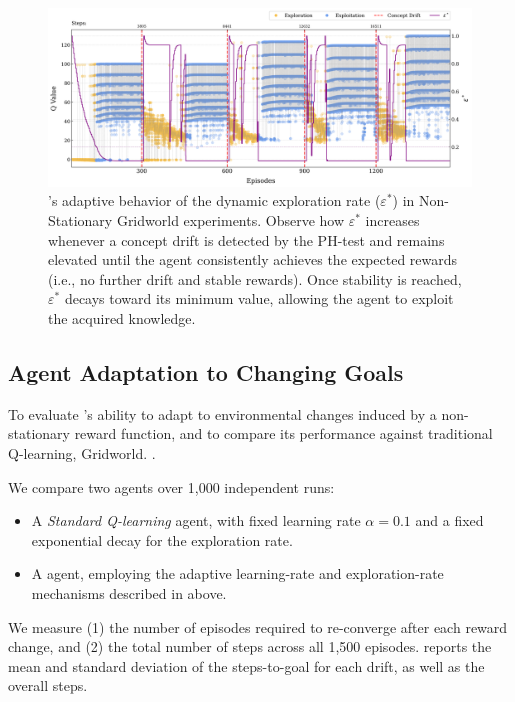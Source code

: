 \begin{figure}
    \centering
    \includegraphics[width=\textwidth]{figures/eps}
    \caption{\adaptiverl's adaptive behavior of the dynamic exploration rate ($\varepsilon^*$) in Non-Stationary Gridworld experiments. Observe how $\varepsilon^*$ increases whenever a concept drift is detected by the PH-test and remains elevated until the agent consistently achieves the expected rewards (i.e., no further drift and stable rewards). Once stability is reached, $\varepsilon^*$ decays toward its minimum value, allowing the agent to exploit the acquired knowledge.}
    \label{fig:dynamic-eps}
\end{figure}

\subsection{Agent Adaptation to Changing Goals}
\label{sec:experiments}

To evaluate \adaptiverl's ability to adapt to environmental changes induced by a non-stationary reward function, and to compare its performance against traditional Q-learning, Gridworld. .

We compare two agents over 1,000 independent runs:  
\begin{itemize}
  \item A \emph{Standard Q-learning} agent, with fixed learning rate $\alpha=0.1$ and a fixed exponential decay for the exploration rate.
  \item A \emph{\adaptiverl} agent, employing the adaptive learning-rate and exploration-rate mechanisms described in above.
\end{itemize}
We measure (1) the number of episodes required to re-converge after each reward change, and (2) the total number of steps across all 1,500 episodes.  reports the mean and standard deviation of the steps-to-goal for each drift, as well as the overall steps.  

